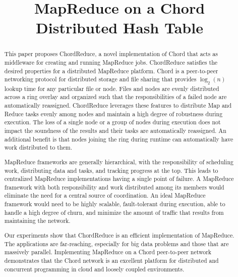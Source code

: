 \documentclass[10pt, conference, compsocconf]{IEEEtran}
\title{MapReduce on a Chord Distributed Hash Table}
\author{\IEEEauthorblockN{Andrew Rosen \qquad Brendan Benshoof \qquad Matt Erwin \qquad Robert W. Harrison \qquad Anu G. Bourgeois}
\IEEEauthorblockA{Department of Computer Science\\
Georgia State University\\
Atlanta, Georgia\\
rosen@cs.gsu.edu}
}
\begin{document}
\maketitle

\begin{abstract}


This paper proposes ChordReduce, a novel implementation of Chord that acts as middleware for creating and running MapReduce jobs. ChordReduce satisfies the desired properties for a distributed MapReduce platform. Chord is a peer-to-peer networking protocol for distributed storage and file sharing that provides $\log_{2}(n)$ lookup time for any particular file or node.  Files and nodes are evenly distributed across a ring overlay and organized such that the responsibilities of a failed node are automatically reassigned.  ChordReduce leverages these features to distribute Map and Reduce tasks evenly among nodes and maintain a high degree of robustness during execution.  The loss of a single node or a group of nodes during execution does not impact the soundness of the results and their tasks are automatically reassigned.  An additional benefit is that nodes joining the ring during runtime can automatically have work distributed to them.

MapReduce frameworks are generally hierarchical, with the responsibility of scheduling work, distributing data and tasks, and tracking progress at the top.  This leads to centralized MapReduce implementations having a single point of failure.  A MapReduce framework with both responsibility and work distributed among its members would eliminate the need for a central source of coordination.  An ideal MapReduce framework would need to be highly scalable, fault-tolerant during execution, able to handle a high degree of churn, and minimize the amount of traffic that results from maintaining the network. 

Our experiments show that ChordReduce is an efficient implementation of MapReduce. The applications are far-reaching, especially for big data problems and those that are massively parallel. Implementing MapReduce on a Chord peer-to-peer network demonstrates that the Chord network is an excellent platform for distributed and concurrent programming in cloud and loosely coupled environments.

\end{abstract}
\end{document}
